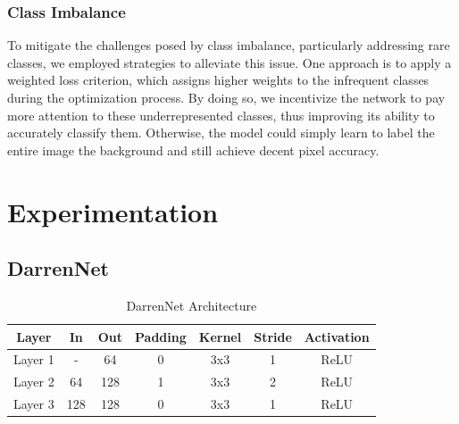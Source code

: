 \subsubsection*{Class Imbalance}
To mitigate the challenges posed by class imbalance, particularly addressing rare classes, we employed strategies to alleviate this issue. One approach is to apply a weighted loss criterion, which assigns higher weights to the infrequent classes during the optimization process. By doing so, we incentivize the network to pay more attention to these underrepresented classes, thus improving its ability to accurately classify them. Otherwise, the model could simply learn to label the entire image the background and still achieve decent pixel accuracy.

\section*{Experimentation}

\subsection*{DarrenNet}
\begin{table}[htbp]
	\centering
	\label{tab:example}
	\setlength{\abovecaptionskip}{10pt}
	\begin{tabular}{|c|c|c|c|c|c|c|}
		\hline
		\textbf{Layer} & \textbf{In} & \textbf{Out} & \textbf{Padding} & \textbf{Kernel} & \textbf{Stride} & \textbf{Activation} \\ \hline
		Layer 1        & -           & 64           & 0                & 3x3             & 1               & ReLU                \\ \hline
		Layer 2        & 64          & 128          & 1                & 3x3             & 2               & ReLU                \\ \hline
		Layer 3        & 128         & 128          & 0                & 3x3             & 1               & ReLU                \\ \hline
	\end{tabular}
	\caption{DarrenNet Architecture}
\end{table}

